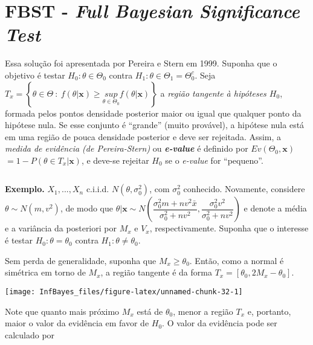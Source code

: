 \documentclass[
]{book}
\begin{document}
\(~\)

\(~\)

\hypertarget{fbst---full-bayesian-significance-test}{%
\section{\texorpdfstring{FBST - \emph{Full Bayesian Significance Test}}{FBST - Full Bayesian Significance Test}}\label{fbst---full-bayesian-significance-test}}

Essa solução foi apresentada por Pereira e Stern em 1999. Suponha que o objetivo é testar \(H_0:\theta\in\Theta_0\) contra \(H_1:\theta \in \Theta_1=\Theta_0^c\). Seja \(T_x=\left\{\theta\in\Theta ~:~f(\theta|\boldsymbol x)\geq \underset{\theta\in\Theta_0}{sup}f(\theta|\boldsymbol x)\right\}\) a \emph{região tangente à hipóteses \(H_0\)}, formada pelos pontos densidade posterior maior ou igual que qualquer ponto da hipótese nula. Se esse conjunto é ``grande'' (muito provável), a hipótese nula está em uma região de pouca densidade posterior e deve ser rejeitada. Assim, a \emph{medida de evidência (de Pereira-Stern)} ou \textbf{\emph{e-value}} é definido por \(Ev(\Theta_0,\boldsymbol x)\) \(=1-P\left(\theta\in T_x \big|\boldsymbol x \right)\), e deve-se rejeitar \(H_0\) se o \emph{e-value} for ``pequeno''.

\(~\)

\textbf{Exemplo.} \(X_1,...,X_n\) c.i.i.d. \(N(\theta,{\sigma}_0^2)\), com \({\sigma}_0^2\) conhecido. Novamente, considere \(\theta\sim N(m,v^2)\), de modo que \(\theta|\boldsymbol x \sim N\left(\dfrac{{\sigma}_0^2m+nv^2\bar{x}}{{\sigma}_0^2+nv^2},\dfrac{{\sigma}_0^2v^2}{{\sigma}_0^2+nv^2}\right)\) e denote a média e a variância da posteriori por \(M_x\) e \(V_x\), respectivamente. Suponha que o interesse é testar \(H_0:\theta=\theta_0\) contra \(H_1:\theta\neq\theta_0\).

Sem perda de generalidade, suponha que \(M_x \geq \theta_0\). Então, como a normal é simétrica em torno de \(M_x\), a região tangente é da forma \(T_x=[\theta_0,2M_x-\theta_0]\).

\begin{center}\texttt{[image: InfBayes\_files/figure-latex/unnamed-chunk-32-1]} \end{center}

Note que quanto mais próximo \(M_x\) está de \(\theta_0\), menor a região \(T_x\) e, portanto, maior o valor da evidência em favor de \(H_0\). O valor da evidência pode ser calculado por
\end{document}
